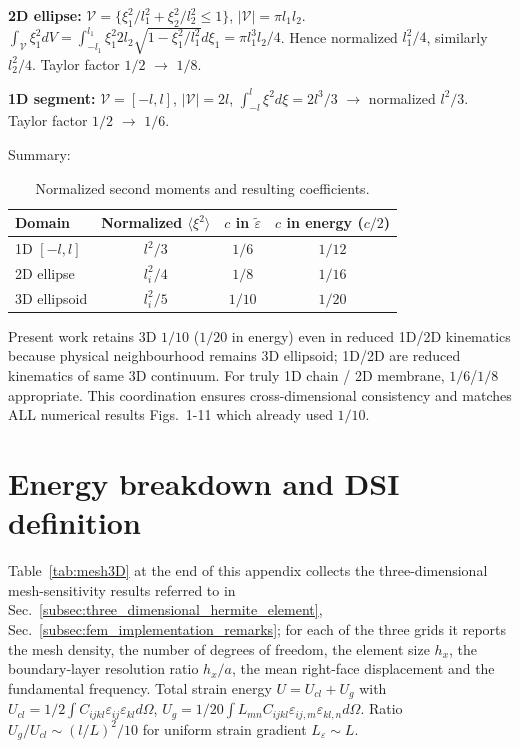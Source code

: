 \documentclass[final,3p,times,fleqn]{elsarticle}
\newcommand{\revtwo}[1]{\textcolor{revtwocolor}{#1}}
\begin{document}
\textbf{2D ellipse:} $\mathcal{V}=\{\xi_1^2/l_1^2+\xi_2^2/l_2^2\le1\}$, $|\mathcal{V}|=\pi l_1l_2$. $\int_{\mathcal{V}} \xi_1^2 dV = \int_{-l_1}^{l_1} \xi_1^2 2 l_2\sqrt{1-\xi_1^2/l_1^2} d\xi_1 = \pi l_1^3 l_2/4$. Hence normalized $l_1^2/4$, similarly $l_2^2/4$. Taylor factor $1/2$ $\rightarrow$ $1/8$.

\textbf{1D segment:} $\mathcal{V}=[-l,l]$, $|\mathcal{V}|=2l$, $\int_{-l}^{l}\xi^2 d\xi =2l^3/3$ $\rightarrow$ normalized $l^2/3$. Taylor factor $1/2$ $\rightarrow$ $1/6$.

Summary:
\begin{table}[h]
\centering
\caption{Normalized second moments and resulting coefficients.}
\label{tab:coeffs}
\begin{tabular}{lccc}
\hline
Domain & Normalized $\langle\xi^2\rangle$ & $c$ in $\tilde{\varepsilon}$ & $c$ in energy ($c/2$) \\
\hline
1D $[-l,l]$ & $l^2/3$ & $1/6$ & $1/12$ \\
2D ellipse & $l_i^2/4$ & $1/8$ & $1/16$ \\
3D ellipsoid & $l_i^2/5$ & $1/10$ & $1/20$ \\
\hline
\end{tabular}
\end{table}

Present work retains 3D $1/10$ ($1/20$ in energy) even in reduced 1D/2D kinematics because physical neighbourhood remains 3D ellipsoid; 1D/2D are reduced kinematics of same 3D continuum. For truly 1D chain / 2D membrane, $1/6$/$1/8$ appropriate. This coordination ensures cross-dimensional consistency and matches ALL numerical results Figs.~1-11 which already used $1/10$.

\section{Energy breakdown and DSI definition}
\label{app:energy}
\revtwo{Table~\ref{tab:mesh3D} at the end of this appendix collects the
three-dimensional mesh-sensitivity results referred to in
Sec.~\ref{subsec:three_dimensional_hermite_element},
Sec.~\ref{subsec:fem_implementation_remarks}; for each of the three grids it
reports the mesh density, the number of degrees of freedom, the element
size $h_{x}$, the boundary-layer resolution ratio $h_{x}/a$, the mean
right-face displacement and the fundamental frequency. }Total strain energy $U=U_{cl}+U_{g}$ with $U_{cl}=1/2\int C_{ijkl}\varepsilon_{ij}\varepsilon_{kl}d\Omega$, $U_g=1/20\int L_{mn}C_{ijkl}\varepsilon_{ij,m}\varepsilon_{kl,n}d\Omega$. Ratio $U_g/U_{cl}\sim (l/L)^2/10$ for uniform strain gradient $L_\varepsilon\sim L$.
\end{document}
